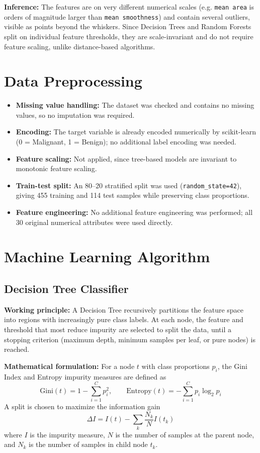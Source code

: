 \documentclass[12pt,a4paper]{article}
\begin{document}
\textbf{Inference:} The features are on very different numerical scales (e.g. \texttt{mean
area} is orders of magnitude larger than \texttt{mean smoothness}) and contain several
outliers, visible as points beyond the whiskers. Since Decision Trees and Random Forests
split on individual feature thresholds, they are scale-invariant and do not require feature
scaling, unlike distance-based algorithms.

\section{Data Preprocessing}
\begin{itemize}
\item \textbf{Missing value handling:} The dataset was checked and contains no missing
values, so no imputation was required.
\item \textbf{Encoding:} The target variable is already encoded numerically by
scikit-learn (0 = Malignant, 1 = Benign); no additional label encoding was needed.
\item \textbf{Feature scaling:} Not applied, since tree-based models are invariant to
monotonic feature scaling.
\item \textbf{Train-test split:} An 80--20 stratified split was used (\texttt{random\_state=42}),
giving 455 training and 114 test samples while preserving class proportions.
\item \textbf{Feature engineering:} No additional feature engineering was performed; all 30
original numerical attributes were used directly.
\end{itemize}

\section{Machine Learning Algorithm}

\subsection*{Decision Tree Classifier}
\textbf{Working principle:} A Decision Tree recursively partitions the feature space into
regions with increasingly pure class labels. At each node, the feature and threshold that
most reduce impurity are selected to split the data, until a stopping criterion (maximum
depth, minimum samples per leaf, or pure nodes) is reached.

\textbf{Mathematical formulation:} For a node $t$ with class proportions $p_i$, the Gini
Index and Entropy impurity measures are defined as
\begin{equation}
\text{Gini}(t) = 1 - \sum_{i=1}^{C} p_i^2, \qquad
\text{Entropy}(t) = -\sum_{i=1}^{C} p_i \log_2 p_i
\end{equation}
A split is chosen to maximize the information gain
\begin{equation}
\Delta I = I(t) - \sum_{k} \frac{N_k}{N} I(t_k)
\end{equation}
where $I$ is the impurity measure, $N$ is the number of samples at the parent node, and $N_k$
is the number of samples in child node $t_k$.
\end{document}
